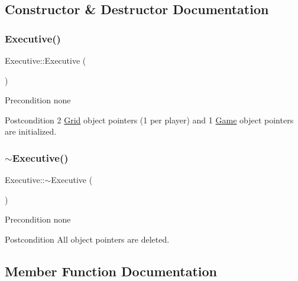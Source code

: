 \subsection{Constructor \& Destructor Documentation}
\mbox{\label{classExecutive_ad870c1d741f1f313eb0c5a8336f8af6b}} 
\subsubsection{\texorpdfstring{Executive()}{Executive()}}
{\footnotesize\ttfamily Executive\+::\+Executive (\begin{DoxyParamCaption}{ }\end{DoxyParamCaption})}

\begin{DoxyPrecond}{Precondition}
none 
\end{DoxyPrecond}
\begin{DoxyPostcond}{Postcondition}
2 \hyperlink{classGrid}{Grid} object pointers (1 per player) and 1 \hyperlink{classGame}{Game} object pointers are initialized. 
\end{DoxyPostcond}
\mbox{\label{classExecutive_a4ce80c499f7640b1770ade77cf56d965}} 
\subsubsection{\texorpdfstring{$\sim$\+Executive()}{~Executive()}}
{\footnotesize\ttfamily Executive\+::$\sim$\+Executive (\begin{DoxyParamCaption}{ }\end{DoxyParamCaption})}

\begin{DoxyPrecond}{Precondition}
none 
\end{DoxyPrecond}
\begin{DoxyPostcond}{Postcondition}
All object pointers are deleted. 
\end{DoxyPostcond}


\subsection{Member Function Documentation}
\mbox{\label{classExecutive_a1a5fd9d5a7357663b31bae642e0723d9}} 
